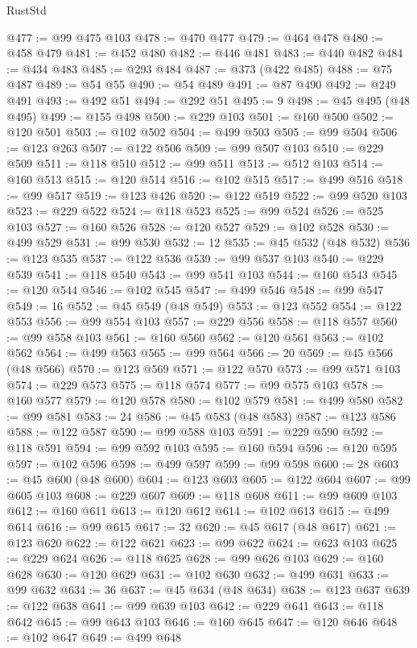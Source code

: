 \begin{lexlean}{RustStd}
\begin{coremodule}
@477 := @99 @475 @103
@478 := @470 @477
@479 := @464 @478
@480 := @458 @479
@481 := @452 @480
@482 := @446 @481
@483 := @440 @482
@484 := @434 @483
@485 := @293 @484
@487 := @373 (@422 @485)
@488 := @75 @487
@489 := @54 @55
@490 := @54 @489
@491 := @87 @490
@492 := @249 @491
@493 := @492 @51
@494 := @292 @51
@495 := 9
@498 := @45 @495 (@48 @495)
@499 := @155 @498
@500 := @229 @103
@501 := @160 @500
@502 := @120 @501
@503 := @102 @502
@504 := @499 @503
@505 := @99 @504
@506 := @123 @263
@507 := @122 @506
@509 := @99 @507 @103
@510 := @229 @509
@511 := @118 @510
@512 := @99 @511
@513 := @512 @103
@514 := @160 @513
@515 := @120 @514
@516 := @102 @515
@517 := @499 @516
@518 := @99 @517
@519 := @123 @426
@520 := @122 @519
@522 := @99 @520 @103
@523 := @229 @522
@524 := @118 @523
@525 := @99 @524
@526 := @525 @103
@527 := @160 @526
@528 := @120 @527
@529 := @102 @528
@530 := @499 @529
@531 := @99 @530
@532 := 12
@535 := @45 @532 (@48 @532)
@536 := @123 @535
@537 := @122 @536
@539 := @99 @537 @103
@540 := @229 @539
@541 := @118 @540
@543 := @99 @541 @103
@544 := @160 @543
@545 := @120 @544
@546 := @102 @545
@547 := @499 @546
@548 := @99 @547
@549 := 16
@552 := @45 @549 (@48 @549)
@553 := @123 @552
@554 := @122 @553
@556 := @99 @554 @103
@557 := @229 @556
@558 := @118 @557
@560 := @99 @558 @103
@561 := @160 @560
@562 := @120 @561
@563 := @102 @562
@564 := @499 @563
@565 := @99 @564
@566 := 20
@569 := @45 @566 (@48 @566)
@570 := @123 @569
@571 := @122 @570
@573 := @99 @571 @103
@574 := @229 @573
@575 := @118 @574
@577 := @99 @575 @103
@578 := @160 @577
@579 := @120 @578
@580 := @102 @579
@581 := @499 @580
@582 := @99 @581
@583 := 24
@586 := @45 @583 (@48 @583)
@587 := @123 @586
@588 := @122 @587
@590 := @99 @588 @103
@591 := @229 @590
@592 := @118 @591
@594 := @99 @592 @103
@595 := @160 @594
@596 := @120 @595
@597 := @102 @596
@598 := @499 @597
@599 := @99 @598
@600 := 28
@603 := @45 @600 (@48 @600)
@604 := @123 @603
@605 := @122 @604
@607 := @99 @605 @103
@608 := @229 @607
@609 := @118 @608
@611 := @99 @609 @103
@612 := @160 @611
@613 := @120 @612
@614 := @102 @613
@615 := @499 @614
@616 := @99 @615
@617 := 32
@620 := @45 @617 (@48 @617)
@621 := @123 @620
@622 := @122 @621
@623 := @99 @622
@624 := @623 @103
@625 := @229 @624
@626 := @118 @625
@628 := @99 @626 @103
@629 := @160 @628
@630 := @120 @629
@631 := @102 @630
@632 := @499 @631
@633 := @99 @632
@634 := 36
@637 := @45 @634 (@48 @634)
@638 := @123 @637
@639 := @122 @638
@641 := @99 @639 @103
@642 := @229 @641
@643 := @118 @642
@645 := @99 @643 @103
@646 := @160 @645
@647 := @120 @646
@648 := @102 @647
@649 := @499 @648

\end{coremodule}
\end{lexlean}
